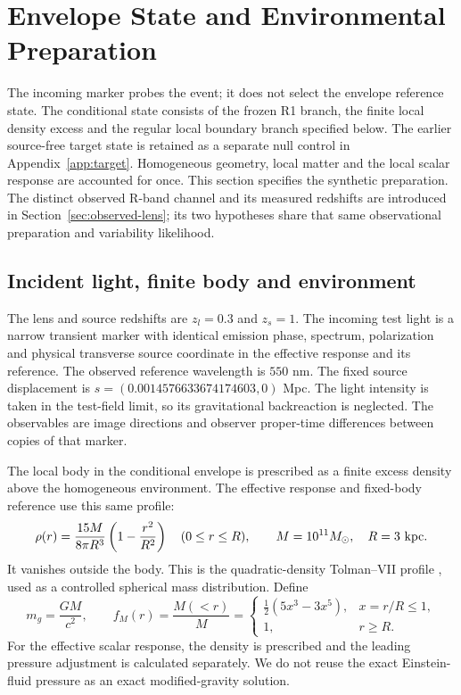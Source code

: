 \section{Envelope State and Environmental Preparation}
\label{sec:models}
The incoming marker probes the event; it does not select the envelope
reference state. The conditional state consists of the frozen R1 branch,
the finite local density excess and the regular local boundary branch
specified below. The earlier source-free target state is retained as a
separate null control in Appendix~\ref{app:target}. Homogeneous geometry,
local matter and the local scalar response are accounted for once.
This section specifies the synthetic preparation. The distinct observed
R-band channel and its measured redshifts are introduced in
Section~\ref{sec:observed-lens}; its two hypotheses share that same
observational preparation and variability likelihood.

\subsection{Incident light, finite body and environment}
The lens and source redshifts are $z_l=0.3$ and $z_s=1$.
The incoming test light is a narrow transient marker with identical
emission phase, spectrum, polarization and physical transverse source
coordinate in the effective response and its reference. The observed reference wavelength is
$550$ nm. The fixed source displacement is
$s=(0.0014576633674174603,0)$ Mpc. The light intensity is taken in the
test-field limit, so its gravitational backreaction is neglected.
The observables are image directions and
observer proper-time differences between copies of that marker.

The local body in the conditional envelope is prescribed as a finite
excess density above the homogeneous environment. The effective response and fixed-body
reference use this same profile:
\begin{equation}
 \rho(r)=\frac{15M}{8\pi R^3}\left(1-\frac{r^2}{R^2}\right)
 \quad(0\le r\le R),\qquad
 M=10^{11}M_\odot,\quad R=3\ {\rm kpc}.
 \label{eq:body}
\end{equation}
It vanishes outside the body. This is the quadratic-density Tolman--VII
profile \citep{Tolman1939}, used as a controlled spherical mass
distribution. Define
\begin{equation}
 m_g=\frac{GM}{c^2},\qquad
 f_M(r)=\frac{M(<r)}{M}
 =\begin{cases}
 \frac12(5x^3-3x^5),&x=r/R\le1,\\
 1,&r\ge R .
 \end{cases}
 \label{eq:enclosed}
\end{equation}
For the effective scalar response, the density is prescribed and the
leading pressure adjustment is calculated separately. We do not reuse the exact
Einstein-fluid pressure as an exact modified-gravity solution.

